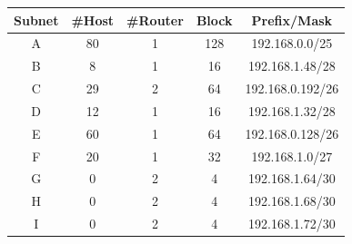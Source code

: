 \begin{center}
    \begin{tabular}{c|c|c|c|c}
        Subnet & \#Host & \#Router & Block & Prefix/Mask \\
        \hline
        \hline
        A & 80 & 1 & 128 & 192.168.0.0/25\\
        \hline
        B &  8 & 1 & 16 & 192.168.1.48/28\\
        \hline
        C &  29 & 2 & 64 &  192.168.0.192/26\\
        \hline
        D &  12 & 1 & 16 & 192.168.1.32/28 \\
        \hline
        E &  60 & 1 & 64 & 192.168.0.128/26 \\
        \hline
        F &  20 & 1 & 32 & 192.168.1.0/27 \\
        \hline
        G &  0 & 2 & 4 & 192.168.1.64/30  \\
        \hline
        H &  0 & 2 & 4 & 192.168.1.68/30  \\
        \hline
        I &  0 & 2 & 4 & 192.168.1.72/30 \\
        
    \end{tabular}
\end{center}